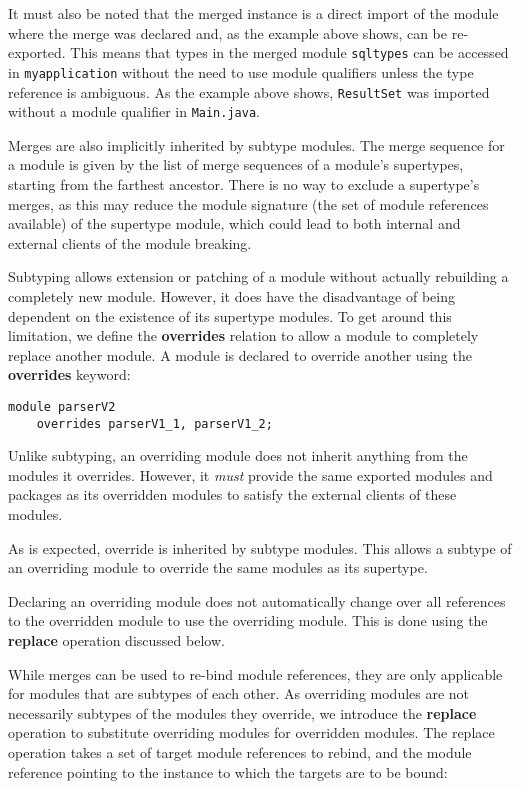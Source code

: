 It must also be noted that the merged instance is a direct import of
the module where the merge was declared and, as the example above shows,
can be re-exported. This means that types in the merged module {\tt sqltypes} 
can be accessed in {\tt myapplication} without the need to use module 
qualifiers unless the type reference is ambiguous. As the example above
shows, {\tt ResultSet} was imported without a module qualifier in
{\tt Main.java}.

Merges are also implicitly inherited by subtype modules. The merge sequence for
a module is given by the list of merge sequences of a module's supertypes, starting
from the farthest ancestor. There is no way to exclude a supertype's merges, as
this may reduce the module signature (the set of module references available) of
the supertype module, which could lead to both internal and external clients of
the module breaking.


Subtyping allows extension or patching of a module without actually
rebuilding a completely new module. However, it does have the disadvantage
of being dependent on the existence of its supertype modules. To get
around this limitation, we define the \textbf{overrides} relation to allow
a module to completely replace another module. A module is declared
to override another using the \textbf{overrides} keyword:

\begin{lstlisting}
module parserV2 
	overrides parserV1_1, parserV1_2;
\end{lstlisting}

Unlike subtyping, an overriding module does not inherit anything from the
modules it overrides. However, it \textit{must} provide the same exported modules
and packages as its overridden modules to satisfy the external 
clients of these modules.

As is expected, override is inherited by subtype modules. This allows a subtype
of an overriding module to override the same modules as its supertype.

Declaring an overriding module does not automatically change over all references
to the overridden module to use the overriding module. This is done using the
\textbf{replace} operation discussed below.


While merges can be used to re-bind module references, they are only applicable 
for modules that are subtypes of each other. As overriding modules are not
necessarily subtypes of the modules they override, we introduce the \textbf{replace} operation
to substitute overriding modules for overridden modules. The replace operation
takes a set of target module references to rebind, and the module reference pointing to the 
instance to which the targets are to be bound:

